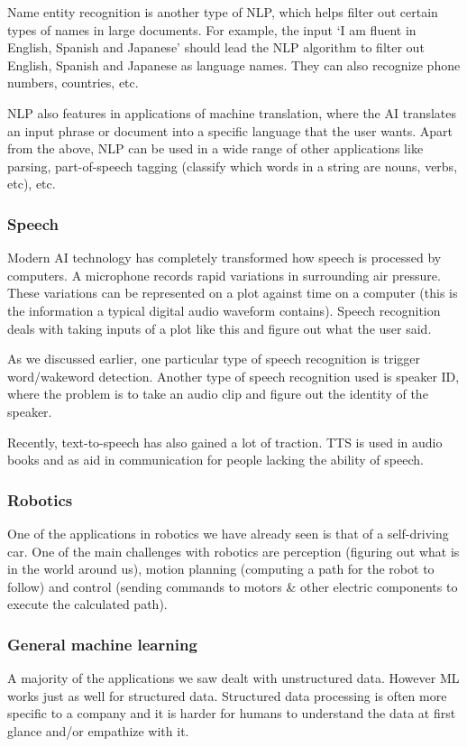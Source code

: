 \documentclass{article}[a4paper,12pt]
\theoremstyle{definition}
\begin{document}
Name entity recognition is another type of NLP, which helps filter out certain types of names in large documents. For example, the input `I am fluent in English, Spanish and Japanese' should lead the NLP algorithm to filter out English, Spanish and Japanese as language names. They can also recognize phone numbers, countries, etc.
\vspace{-6pt}

NLP also features in applications of machine translation, where the AI translates an input phrase or document into a specific language that the user wants. Apart from the above, NLP can be used in a wide range of other applications like parsing, part-of-speech tagging (classify which words in a string are nouns, verbs, etc), etc. 
\subsubsection{Speech}
Modern AI technology has completely transformed how speech is processed by computers. A microphone records rapid variations in surrounding air pressure. These variations can be represented on a plot against time on a computer (this is the information a typical digital audio waveform contains). Speech recognition deals with taking inputs of a plot like this and figure out what the user said.
\vspace{6pt}

As we discussed earlier, one particular type of speech recognition is trigger word/wakeword detection. Another type of speech recognition used is speaker ID, where the problem is to take an audio clip and figure out the identity of the speaker.
\vspace{6pt}

Recently, text-to-speech has also gained a lot of traction. TTS is used in audio books and as aid in communication for people lacking the ability of speech.
\subsubsection{Robotics}
One of the applications in robotics we have already seen is that of a self-driving car. One of the main challenges with robotics are perception (figuring out what is in the world around us), motion planning (computing a path for the robot to follow) and control (sending commands to motors \& other electric components to execute the calculated path).
\subsubsection{General machine learning}
A majority of the applications we saw dealt with unstructured data. However ML works just as well for structured data. Structured data processing is often more specific to a company and it is harder for humans to understand the data at first glance and/or empathize with it.
\end{document}
